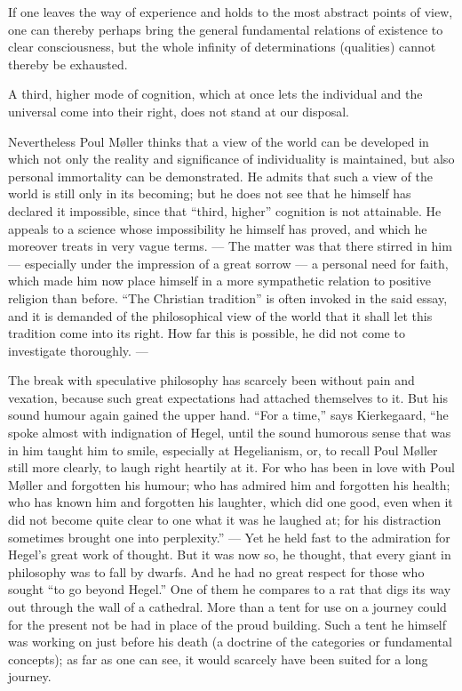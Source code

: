 \documentclass[12pt,a4paper]{book}
\newcommand{\opage}[1]{\marginnote{\footnotesize\textit{[#1]}}}
\begin{document}
If one leaves the way of experience and holds to the most abstract points of view, one can
thereby perhaps bring the general fundamental relations of existence to clear consciousness,
but the whole infinity of determinations (qualities) cannot thereby be exhausted.

A third, higher mode of cognition, which at once lets the individual and the universal come
into their right, does not stand at our disposal.

Nevertheless Poul Møller thinks that a view of the world can be developed in which not only
the reality and significance of individuality is maintained, but also personal immortality
can be demonstrated. He admits that such a view of the world is still only in its becoming;
but he does not see that he himself has declared it impossible, since that ``third, higher''
\opage{121}cognition is not attainable. He appeals to a science whose impossibility he himself has
proved, and which he moreover treats in very vague terms. --- The matter was that there
stirred in him --- especially under the impression of a great sorrow --- a personal need for
faith, which made him now place himself in a more sympathetic relation to positive religion
than before. ``The Christian tradition'' is often invoked in the said essay, and it is
demanded of the philosophical view of the world that it shall let this tradition come into
its right. How far this is possible, he did not come to investigate thoroughly. ---

The break with speculative philosophy has scarcely been without pain and vexation, because
such great expectations had attached themselves to it. But his sound humour again gained the
upper hand. ``For a time,'' says Kierkegaard, ``he spoke almost with indignation of Hegel,
until the sound humorous sense that was in him taught him to smile, especially at
Hegelianism, or, to recall Poul Møller still more clearly, to laugh right heartily at it. For
who has been in love with Poul Møller and forgotten his humour; who has admired him and
forgotten his health; who has known him and forgotten his laughter, which did one good, even
when it did not become quite clear to one what it was he laughed at; for his distraction
sometimes brought one into perplexity.'' --- Yet he held fast to the admiration for Hegel's
great work of thought. But it was now so, he thought, that every giant in philosophy was to
fall by dwarfs. And he had no great respect for those who sought ``to go beyond Hegel.'' One
of them he compares to a rat that digs its way out through the wall of a cathedral. More than
a tent for use on a journey could for the present not be had in place of the proud building.
Such a tent he himself was working on just before his death (a doctrine of the categories or
fundamental concepts); as far as one can see, it would scarcely have been suited for a long
journey.
\end{document}
